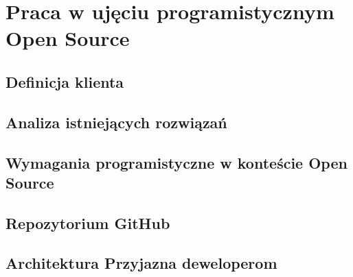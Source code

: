\chapter{Praca w uj\k{e}ciu programistycznym Open Source}

\section{Definicja klienta}


\section{Analiza istniejących rozwiązań}
\section{Wymagania programistyczne w konteście Open Source}
\section{Repozytorium GitHub}
\section{Architektura Przyjazna deweloperom}

